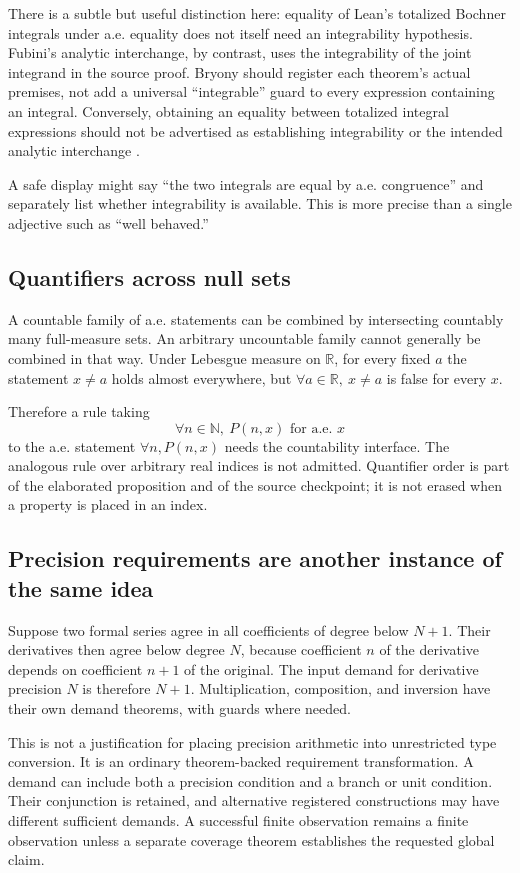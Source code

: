 \documentclass[11pt,a4paper]{article}
\newcommand{\R}{\mathbb R}\newcommand{\Q}{\mathbb Q}\newcommand{\Z}{\mathbb Z}\newcommand{\N}{\mathbb N}
\theoremstyle{definition}\newtheorem{definition}[theorem]{Definition}
\theoremstyle{remark}\newtheorem{remark}[theorem]{Remark}
\begin{document}
There is a subtle but useful distinction here: equality of Lean's totalized Bochner integrals under a.e. equality does not itself need an integrability hypothesis. Fubini's analytic interchange, by contrast, uses the integrability of the joint integrand in the source proof. Bryony should register each theorem's actual premises, not add a universal ``integrable'' guard to every expression containing an integral. Conversely, obtaining an equality between totalized integral expressions should not be advertised as establishing integrability or the intended analytic interchange \cite{subgraph}.

A safe display might say ``the two integrals are equal by a.e. congruence'' and separately list whether integrability is available. This is more precise than a single adjective such as ``well behaved.''

\subsection{Quantifiers across null sets}
A countable family of a.e. statements can be combined by intersecting countably many full-measure sets. An arbitrary uncountable family cannot generally be combined in that way. Under Lebesgue measure on $\R$, for every fixed $a$ the statement $x\ne a$ holds almost everywhere, but $\forall a\in\R,\ x\ne a$ is false for every $x$.

Therefore a rule taking
\[
 \forall n\in\N,\ P(n,x)\text{ for a.e. }x
\]
to the a.e. statement $\forall n, P(n,x)$ needs the countability interface. The analogous rule over arbitrary real indices is not admitted. Quantifier order is part of the elaborated proposition and of the source checkpoint; it is not erased when a property is placed in an index.

\subsection{Precision requirements are another instance of the same idea}
Suppose two formal series agree in all coefficients of degree below $N+1$. Their derivatives then agree below degree $N$, because coefficient $n$ of the derivative depends on coefficient $n+1$ of the original. The input demand for derivative precision $N$ is therefore $N+1$. Multiplication, composition, and inversion have their own demand theorems, with guards where needed.

This is not a justification for placing precision arithmetic into unrestricted type conversion. It is an ordinary theorem-backed requirement transformation. A demand can include both a precision condition and a branch or unit condition. Their conjunction is retained, and alternative registered constructions may have different sufficient demands. A successful finite observation remains a finite observation unless a separate coverage theorem establishes the requested global claim.
\end{document}
